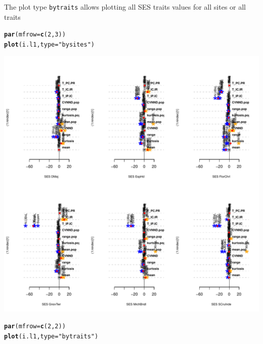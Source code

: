 \documentclass[12pt]{article}\usepackage[]{graphicx}\usepackage[]{color}
\makeatletter
\def\maxwidth{ %
  \ifdim\Gin@nat@width>\linewidth
    \linewidth
  \else
    \Gin@nat@width
  \fi
}
\newcommand{\hlnum}[1]{\textcolor[rgb]{0.686,0.059,0.569}{#1}}%
\newcommand{\hlstr}[1]{\textcolor[rgb]{0.192,0.494,0.8}{#1}}%
\newcommand{\hlstd}[1]{\textcolor[rgb]{0.345,0.345,0.345}{#1}}%
\newcommand{\hlkwc}[1]{\textcolor[rgb]{0.333,0.667,0.333}{#1}}%
\newcommand{\hlkwd}[1]{\textcolor[rgb]{0.737,0.353,0.396}{\textbf{#1}}}%
\newenvironment{kframe}{%
 \def\at@end@of@kframe{}%
 \ifinner\ifhmode%
  \def\at@end@of@kframe{\end{minipage}}%
  \begin{minipage}{\columnwidth}%
 \fi\fi%
 \def\FrameCommand##1{\hskip\@totalleftmargin \hskip-\fboxsep
 \colorbox{shadecolor}{##1}\hskip-\fboxsep
     \hskip-\linewidth \hskip-\@totalleftmargin \hskip\columnwidth}%
 \MakeFramed {\advance\hsize-\width
   \@totalleftmargin\z@ \linewidth\hsize
   \@setminipage}}%
 {\par\unskip\endMakeFramed%
 \at@end@of@kframe}
\newenvironment{knitrout}{}{} %
\makeatother
\begin{document}
The plot type \texttt{bytraits} allows plotting all SES traits values for all sites or all traits
\begin{knitrout}
\color{fgcolor}\begin{kframe}
\begin{alltt}
\hlkwd{par}\hlstd{(}\hlkwc{mfrow} \hlstd{=} \hlkwd{c}\hlstd{(}\hlnum{2}\hlstd{,}\hlnum{3}\hlstd{))}
\hlkwd{plot}\hlstd{(i.l1,}\hlkwc{type} \hlstd{=} \hlstr{"bysites"}\hlstd{)}
\end{alltt}
\end{kframe}
\includegraphics[width=\maxwidth]{figure/unnamed-chunk-51-1} 
\begin{kframe}\begin{alltt}
\hlkwd{par}\hlstd{(}\hlkwc{mfrow} \hlstd{=} \hlkwd{c}\hlstd{(}\hlnum{2}\hlstd{,}\hlnum{2}\hlstd{))}
\hlkwd{plot}\hlstd{(i.l1,}\hlkwc{type} \hlstd{=} \hlstr{"bytraits"}\hlstd{)}
\end{alltt}
\end{kframe}

\end{knitrout}
\end{document}
